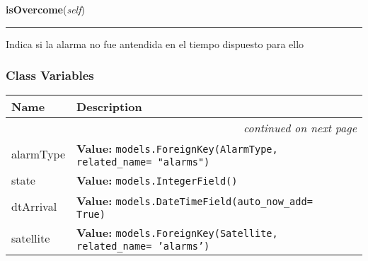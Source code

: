     \label{GroundSegment:models:Alarm:Alarm:Alarm:isOvercome}

    \vspace{0.5ex}

\hspace{.8\funcindent}\begin{boxedminipage}{\funcwidth}

    \raggedright \textbf{isOvercome}(\textit{self})

    \vspace{-1.5ex}

    \rule{\textwidth}{0.5\fboxrule}
\setlength{\parskip}{2ex}
    Indica si la alarma no fue antendida en el tiempo dispuesto para ello

\setlength{\parskip}{1ex}
    \end{boxedminipage}



  \subsubsection{Class Variables}

    \vspace{-1cm}
\hspace{\varindent}\begin{longtable}{|p{\varnamewidth}|p{\vardescrwidth}|l}
\cline{1-2}
\cline{1-2} \centering \textbf{Name} & \centering \textbf{Description}& \\
\cline{1-2}
\endhead\cline{1-2}\multicolumn{3}{r}{\small\textit{continued on next page}}\\\endfoot\cline{1-2}
\endlastfoot\raggedright a\-l\-a\-r\-m\-T\-y\-p\-e\- & \raggedright \textbf{Value:} 
{\tt models.ForeignKey(AlarmType, related\_name= "alarms")}&\\
\cline{1-2}
\raggedright s\-t\-a\-t\-e\- & \raggedright \textbf{Value:} 
{\tt models.IntegerField()}&\\
\cline{1-2}
\raggedright d\-t\-A\-r\-r\-i\-v\-a\-l\- & \raggedright \textbf{Value:} 
{\tt models.DateTimeField(auto\_now\_add= True)}&\\
\cline{1-2}
\raggedright s\-a\-t\-e\-l\-l\-i\-t\-e\- & \raggedright \textbf{Value:} 
{\tt models.ForeignKey(Satellite, related\_name= 'alarms')}&\\
\cline{1-2}
\end{longtable}

